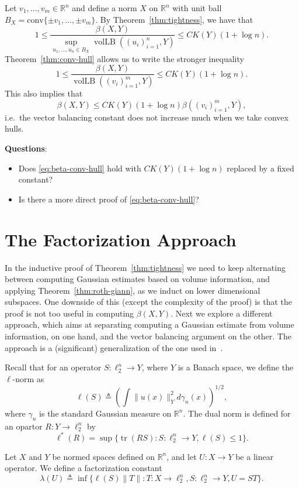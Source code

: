 \documentclass{article}
\newcommand{\R}{{\mathbb{R}}}
\newcommand{\eqdef}{\triangleq}
\DeclareMathOperator{\vollb}{volLB}
\DeclareMathOperator{\tr}{tr}
\begin{document}
Let $v_1, \ldots, v_m \in \R^n$ and define a norm $X$ on $\R^n$ with
unit ball $B_X = \mathrm{conv}\{\pm v_1, \ldots, \pm v_m\}$. By
Theorem~\ref{thm:tightness}, we have that 
\[
1 \le \frac{\beta(X, Y)}{\sup_{u_1, \ldots, u_n \in
    B_X}\vollb((u_i)_{i = 1}^n, Y)} \le C K(Y)(1+\log n).
\]
Theorem~\ref{thm:conv-hull} allows us to write the stronger inequality
\[
1 \le \frac{\beta(X, Y)}{\vollb((v_i)_{i = 1}^m, Y)} \le C K(Y)(1+\log n).
\]
This also implies that
\begin{equation}\label{eq:beta-conv-hull}
\beta(X, Y) \le CK(Y)(1+\log n) \beta((v_i)_{i = 1}^m, Y),
\end{equation}
i.e.~the vector balancing constant does not increase much when we take
convex hulls. 

\medskip\noindent
\textbf{Questions}:
\begin{itemize}
\item Does \eqref{eq:beta-conv-hull} hold with $CK(Y)(1+\log n)$
  replaced by a fixed constant?
\item Is there a more direct proof of \eqref{eq:beta-conv-hull}?
\end{itemize}

\section{The Factorization Approach}

In the inductive proof of Theorem~\ref{thm:tightness} we need to keep
alternating between computing Gaussian estimates based on volume
information, and applying Theorem~\ref{thm:roth-giann}, as we induct on
lower dimensional subspaces. One downside of this (except the
complexity of the proof) is that the proof is not too useful in
computing $\beta(X, Y)$. Next we explore a different approach, which
aims at separating computing a Gaussian estimate from volume
information, on one hand, and the vector balancing argument on the
other. The approach is a (significant) generalization of the one used
in~\cite{disc-gamma2}. 

Recall that for an operator $S:\ell_2^n \to Y$, where $Y$ is a Banach
space, we define the $\ell$-norm as
\[
\ell(S) \eqdef \left( \int \|u(x)\|_Y^2 d\gamma_n(x) \right)^{1/2},
\]
where $\gamma_n$ is the standard Gaussian measure on $\R^n$. The dual
norm is defined for an opartor $R: Y \to \ell_2^n$ by 
\[
\ell^*(R) = \sup\{\tr(RS): S: \ell_2^n \to Y, \ell(S) \le 1\}.
\]

Let $X$ and $Y$ be normed spaces defined on $\R^n$, and let $U:X \to
Y$ be a linear operator. We define a factorization constant
\[
\lambda(U) \eqdef \inf \{\ell(S)\|T\|: T: X \to \ell_2^n, S: \ell_2^n
\to Y, U = ST\}.
\]
\end{document}
